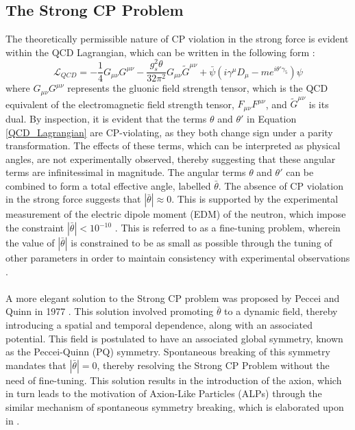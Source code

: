 \subsection{The Strong CP Problem}\label{StrongCPProb}
The theoretically permissible nature of CP violation in the strong force is evident within the QCD Lagrangian, which can be written in the following form \cite{Michael:920}:
\begin{equation}\label{QCD_Lagrangian}
    \mathcal{L}_{QCD} = -\frac{1}{4}G_{\mu\nu}G^{\mu\nu}-\frac{g_{s}^{2}\theta}{32\pi^{2}}G_{\mu\nu}\tilde{G}^{\mu\nu}+\bar{\psi}(i\gamma^{\mu}D_{\mu}-me^{i\theta'\gamma_{5}})\psi
\end{equation}
where $G_{\mu\nu}G^{\mu\nu}$ represents the gluonic field strength tensor, which is the QCD equivalent of the electromagnetic field strength tensor, $F_{\mu\nu}F^{\mu\nu}$, and $\tilde{G}^{\mu\nu}$ is its dual. By inspection, it is evident that the terms $\theta$ and $\theta'$ in Equation \ref{QCD_Lagrangian} are CP-violating, as they both 
change sign under a parity transformation. The effects of these terms, which can be interpreted as physical angles, are not experimentally observed, thereby suggesting that these angular terms are infinitessimal in magnitude. The angular terms $\theta$ and $\theta'$ can be combined to form a total effective angle, labelled $\bar{\theta}$. The absence
of CP violation in the strong force suggests that $|\bar{\theta}|\approx 0$. This is supported by the experimental measurement of the electric dipole moment (EDM) of the neutron, which impose the constraint $|\bar{\theta}| < 10^{-10}$ \cite{PhysRevLett.124.081803}. This is referred to as a fine-tuning problem, wherein the value of $|\bar{\theta}|$ is constrained to be as small as possible
through the tuning of other parameters in order to maintain consistency with experimental observations \cite{https://doi.org/10.48550/arxiv.hep-ph/9704427}.\\
\\
A more elegant solution to the Strong CP problem was proposed by Peccei and Quinn in 1977 \cite{article}. This solution involved promoting $\bar{\theta}$ to a dynamic field, thereby introducing a spatial and temporal dependence, along with an associated
potential. This field is postulated to have an associated global symmetry, known as the Peccei-Quinn (PQ) symmetry. Spontaneous breaking of this symmetry mandates that $|\bar{\theta}| = 0$, thereby resolving the Strong CP Problem without the need of fine-tuning. This solution 
results in the introduction of the axion, which in turn leads to the motivation of Axion-Like Particles (ALPs) through the similar mechanism of spontaneous symmetry breaking, which is elaborated upon in \cite{Beekman_2019}.
